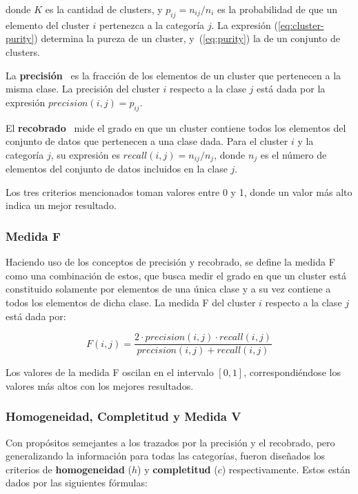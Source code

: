 \noindent
donde $K$ es la cantidad de clusters, y $p_{ij} = n_{ij}/n_i$ es la probabilidad de que un elemento del cluster $i$ pertenezca a la categoría $j$.
La expresión (\ref{eq:cluster-purity}) determina la pureza de un cluster, y~(\ref{eq:purity}) la de un conjunto de clusters.

La \textbf{precisión}~\cite{Aggarawal13,Tan05} es la fracción de los elementos de un cluster que pertenecen a la misma clase.
La precisión del cluster $i$ respecto a la clase $j$ está dada por la expresión $precision(i,j) = p_{ij}$.

El \textbf{recobrado}~\cite{Aggarawal13,Tan05} mide el grado en que un cluster contiene todos los elementos del conjunto de datos que pertenecen a una clase dada.
Para el cluster $i$ y la categoría $j$, su expresión es $recall(i,j) = n_{ij}/n_j$, donde $n_j$ es el número de elementos del conjunto de datos incluidos en la clase $j$.

Los tres criterios mencionados toman valores entre 0 y 1, donde un valor más alto indica un mejor resultado.

\subsubsection{Medida F}

Haciendo uso de los conceptos de precisión y recobrado, se define la medida F~\cite{Aggarawal13,Tan05,Wagner07} como una combinación de estos, que busca medir el grado en que un cluster está constituido solamente por elementos de una única clase y a su vez contiene a todos los elementos de dicha clase.
La medida F del cluster $i$ respecto a la clase $j$ está dada por:

\begin{equation}
    \label{eq:F-measure}
    F(i,j) = \frac{2 \cdot precision(i,j) \cdot recall(i,j)}{precision(i,j) + recall(i,j)}
\end{equation}

Los valores de la medida F oscilan en el intervalo $[0,1]$, correspondiéndose los valores más altos con los mejores resultados.

\subsubsection{Homogeneidad, Completitud y Medida V}

Con propósitos semejantes a los trazados por la precisión y el recobrado, pero generalizando la información para todas las categorías, fueron diseñados los criterios de \textbf{homogeneidad} ($h$) y \textbf{completitud} ($c$) respectivamente.
Estos están dados por las siguientes fórmulas:

